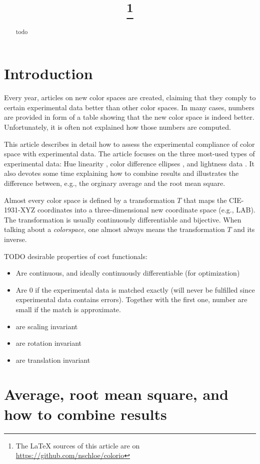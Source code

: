 \documentclass{scrartcl}
\title{\mytitle\footnote{The LaTeX sources of this article are on
\url{https://github.com/nschloe/colorio}}}
\author{\myauthor}
\theoremstyle{named}
\begin{document}
\maketitle
\begin{abstract}
  todo
\end{abstract}

\section{Introduction}

Every year, articles on new color spaces are created, claiming that they comply to
certain experimental data better than other color spaces. In many cases, numbers are
provided in form of a table showing that the new color space is indeed better.
Unfortunately, it is often not explained how those numbers are computed.

This article describes in detail how to assess the experimental compliance of color
space with experimental data. The article focuses on the three most-used types of
experimental data: Hue linearity \cite{ebner,xiao,hung}, color difference ellipses
\cite{macadam1942,luorigg}, and lightness data \cite{fairchildchen}. It also devotes
some time explaining how to combine results and illustrates the difference between,
e.g., the orginary average and the root mean square.

Almost every color space is defined by a transformation $T$ that maps the CIE-1931-XYZ
coordinates into a three-dimensional new coordinate space (e.g., LAB). The
transformation is usually continuously differentiable and bijective. When talking about
a \emph{colorspace}, one almost always means the transformation $T$ and its inverse.


TODO desirable properties of cost functionals:
\begin{itemize}
  \item Are continuous, and ideally continuously differentiable (for optimization)
  \item Are 0 if the experimental data is matched exactly (will never be fulfilled since
    experimental data contains errors). Together with the first one, number are small if
    the match is approximate.
  \item are scaling invariant
  \item are rotation invariant
  \item are translation invariant
\end{itemize}


\section{Average, root mean square, and how to combine results}
\end{document}
